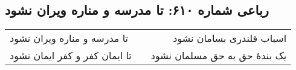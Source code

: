 \begin{center}
\section*{رباعی شماره ۶۱۰: تا مدرسه و مناره ویران نشود}
\label{sec:0610}
\begin{longtable}{l p{0.5cm} r}
تا مدرسه و مناره ویران نشود
&&
اسباب قلندری بسامان نشود
\\
تا ایمان کفر و کفر ایمان نشود
&&
یک بندهٔ حق به حق مسلمان نشود
\\
\end{longtable}
\end{center}
